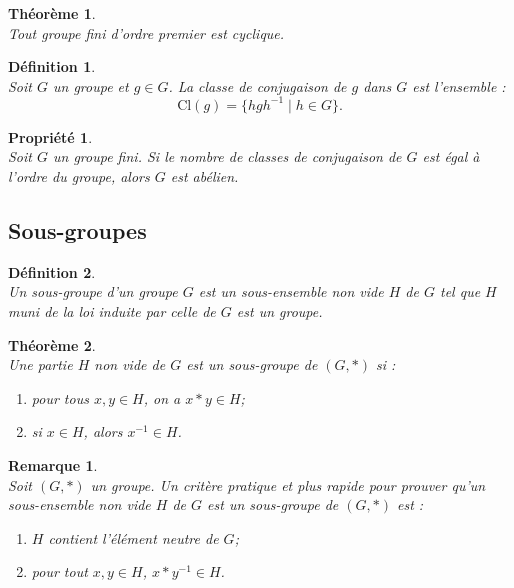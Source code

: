 \documentclass[a4paper, 14pt]{report}
\newtheorem{definition}{Définition}[section]
\newtheorem{remark}{Remarque}[section]
\newtheorem{propriety}{Propriété}[section]
\newtheorem{theorem}{Théorème}[section]
\begin{document}
\begin{onehalfspace}
{\begin{theorem} \cite{schaub1997} \\
Tout groupe fini d’ordre premier est cyclique.
\end{theorem}

\begin{definition} \cite{schaub1997} \\
Soit \( G \) un groupe et \( g \in G \). La classe de conjugaison de \( g \) dans \( G \) est l’ensemble :
	\[
	\text{Cl}(g) = \{ hgh^{-1} \mid h \in G \}.
	\]
\end{definition}

\begin{propriety} \cite{schaub1997} \label{proprie0}\\
Soit \( G \) un groupe fini. Si le nombre de classes de conjugaison de \( G \) est égal à l’ordre du groupe, alors \( G \) est abélien.
\end{propriety}

\subsection{Sous-groupes}
\begin{definition} \cite{hall2018theory} \\
Un sous-groupe d'un groupe $G$ est un sous-ensemble non vide $H$ de $G$ tel que $H$ muni  de la loi induite par celle de $G$ est un groupe.
\end{definition}

\begin{theorem}  \cite{hall2018theory} \\
Une partie $H$ non vide de $G$ est un sous-groupe de $(G,*)$ si :
	\begin{enumerate} [label=\roman*)]
		\item pour tous $x, y \in H$, on a $x * y \in H$;
		\item si $x \in H$, alors $x^{-1} \in H$.
	\end{enumerate}
\end{theorem}


\begin{remark} \cite{hall2018theory} \\
Soit $(G,*)$ un groupe.
Un critère pratique et plus rapide pour prouver qu'un sous-ensemble non vide $H$ de $G$ est un sous-groupe de $(G,*)$ est :
	\begin{enumerate} [label=\roman*)]
		\item $H$ contient l'élément neutre de $G$;
		\item pour tout $x, y \in H$, $x * y^{-1} \in H$.
	\end{enumerate}
\end{remark}

}
\end{onehalfspace}
\end{document}
